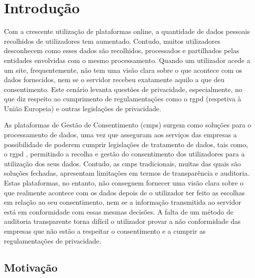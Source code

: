 \chapter{Introdução}
\label{cap:introducao}

Com a crescente utilização de plataformas online, a quantidade de dados pessoais recolhidos de utilizadores tem aumentado. Contudo, muitos utilizadores desconhecem como esses dados são recolhidos, processados e partilhados pelas entidades envolvidas com o mesmo processamento. Quando um utilizador acede a um site, frequentemente, não tem uma visão clara sobre o que acontece com os dados fornecidos, nem se o servidor recebeu exatamente aquilo a que deu consentimento. Este cenário levanta questões de privacidade, especialmente, no que diz respeito ao cumprimento de regulamentações como o \acrfull{rgpd} (respetiva à União Europeia) e outras legislações de privacidade.

As plataformas de Gestão de Consentimento (\acrshort{cmp}s) surgem como soluções para o processamento de dados, uma vez que asseguram aos serviços das empresas a possibilidade de poderem cumprir legislações de tratamento de dados, tais como, o \acrshort{rgpd} \citep{Santos2021}, permitindo a recolha e gestão do consentimento dos utilizadores para a utilização dos seus dados. Contudo, as \acrshort{cmp}s tradicionais, muitas das quais são soluções fechadas, apresentam limitações em termos de transparência e auditoria. 
Estas plataformas, no entanto, não conseguem fornecer uma visão clara sobre o que realmente acontece com os dados depois de o utilizador ter feito as escolhas em relação ao seu consentimento, nem se a informação transmitida ao servidor está em conformidade com essas mesmas decisões. A falta de um método de auditoria transparente torna difícil o utilizador provar a não conformidade das empresas que não estão a respeitar o consentimento e a cumprir as regulamentações de privacidade.

\section{Motivação}

